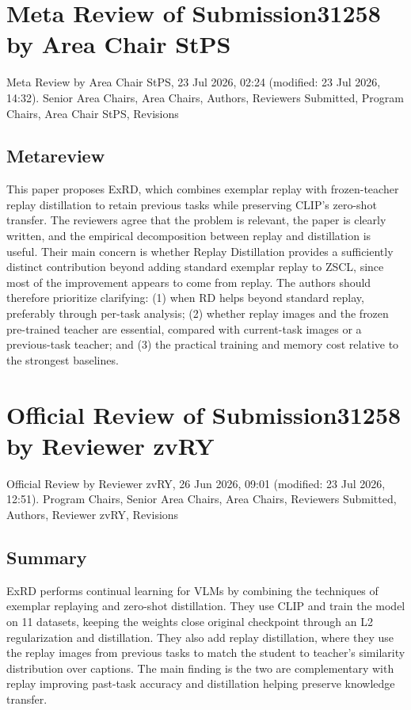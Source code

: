 \documentclass[11pt]{article}
\begin{document}
\newpage
\section*{Meta Review of Submission31258 by Area Chair StPS}

Meta Review by Area Chair StPS, 23 Jul 2026, 02:24 (modified: 23 Jul 2026, 14:32). Senior Area Chairs, Area Chairs, Authors, Reviewers Submitted, Program Chairs, Area Chair StPS, Revisions

\subsection*{Metareview}
This paper proposes ExRD, which combines exemplar replay with frozen-teacher replay distillation to retain previous tasks while preserving CLIP's zero-shot transfer. The reviewers agree that the problem is relevant, the paper is clearly written, and the empirical decomposition between replay and distillation is useful. Their main concern is whether Replay Distillation provides a sufficiently distinct contribution beyond adding standard exemplar replay to ZSCL, since most of the improvement appears to come from replay. The authors should therefore prioritize clarifying: (1) when RD helps beyond standard replay, preferably through per-task analysis; (2) whether replay images and the frozen pre-trained teacher are essential, compared with current-task images or a previous-task teacher; and (3) the practical training and memory cost relative to the strongest baselines.

\newpage
\section*{Official Review of Submission31258 by Reviewer zvRY}

Official Review by Reviewer zvRY, 26 Jun 2026, 09:01 (modified: 23 Jul 2026, 12:51). Program Chairs, Senior Area Chairs, Area Chairs, Reviewers Submitted, Authors, Reviewer zvRY, Revisions

\subsection*{Summary}
ExRD performs continual learning for VLMs by combining the techniques of exemplar replaying and zero-shot distillation. They use CLIP and train the model on 11 datasets, keeping the weights close original checkpoint through an L2 regularization and distillation. They also add replay distillation, where they use the replay images from previous tasks to match the student to teacher's similarity distribution over captions. The main finding is the two are complementary with replay improving past-task accuracy and distillation helping preserve knowledge transfer.
\end{document}
